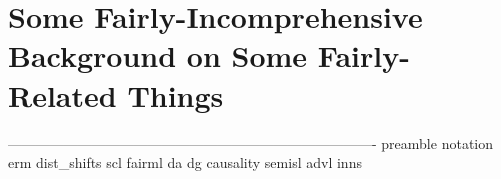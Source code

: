 \chapter{
  Some Fairly-Incomprehensive Background on Some Fairly-Related Things
}\label{ch:background}
-------------------------------------------------------------------------------
{preamble}
{notation}
{erm}
{dist_shifts}
{scl}
{fairml}
{da}
{dg}
{causality}
{semisl}
{advl}
{inns}

